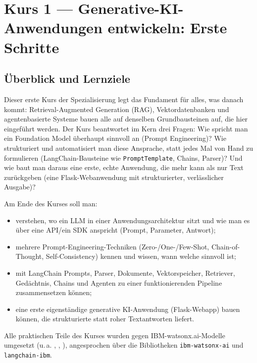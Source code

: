 \chapter{Kurs 1 --- Generative-KI-Anwendungen entwickeln: Erste Schritte}

\section{Überblick und Lernziele}

Dieser erste Kurs der Spezialisierung legt das Fundament für alles, was danach kommt:
Retrieval-Augmented Generation (RAG), Vektordatenbanken und agentenbasierte Systeme bauen
alle auf denselben Grundbausteinen auf, die hier eingeführt werden. Der Kurs beantwortet
im Kern drei Fragen: Wie spricht man ein Foundation Model überhaupt sinnvoll an (Prompt
Engineering)? Wie strukturiert und automatisiert man diese Ansprache, statt jedes Mal von
Hand zu formulieren (LangChain-Bausteine wie \texttt{PromptTemplate}, Chains, Parser)? Und
wie baut man daraus eine erste, echte Anwendung, die mehr kann als nur Text zurückgeben
(eine Flask-Webanwendung mit strukturierter, verlässlicher Ausgabe)?

Am Ende des Kurses soll man:
\begin{itemize}
    \item verstehen, wo ein LLM in einer Anwendungsarchitektur sitzt und wie man es über
          eine API/ein SDK anspricht (Prompt, Parameter, Antwort);
    \item mehrere Prompt-Engineering-Techniken (Zero-/One-/Few-Shot, Chain-of-Thought,
          Self-Consistency) kennen und wissen, wann welche sinnvoll ist;
    \item mit LangChain Prompts, Parser, Dokumente, Vektorspeicher, Retriever, Gedächtnis,
          Chains und Agenten zu einer funktionierenden Pipeline zusammensetzen können;
    \item eine erste eigenständige generative KI-Anwendung (Flask-Webapp) bauen können, die
          strukturierte statt roher Textantworten liefert.
\end{itemize}

Alle praktischen Teile des Kurses wurden gegen IBM-watsonx.ai-Modelle umgesetzt
(u.\,a. \texttt{}, \texttt{},
\texttt{}), angesprochen
über die Bibliotheken \texttt{ibm-watsonx-ai} und \texttt{langchain-ibm}.

